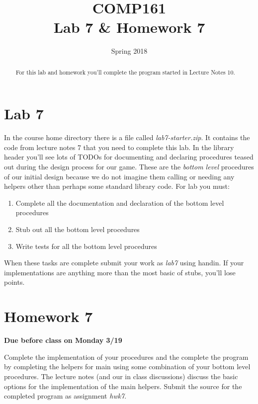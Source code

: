 \documentclass[nobib]{tufte-handout}
\title{COMP161 \\ Lab 7 \& Homework 7}
\author{}
\date{Spring 2018}
\begin{document}
\maketitle

\begin{abstract}
For this lab and homework you'll complete the program started in Lecture Notes 10.
\end{abstract}

\section{Lab 7}

In the course home directory there is a file called \textit{lab7-starter.zip}. It contains the code from lecture notes 7 that you need to complete this lab. In the library header you'll see lots of TODOs for documenting and declaring procedures teased out during the design process for our game. These are the \textit{bottom level} procedures of our initial design because we do not imagine them calling or needing any helpers other than perhaps some standard library code. For lab you must:
\begin{enumerate}
\item Complete all the documentation and declaration of the bottom level procedures
\item Stub out all the bottom level procedures
\item Write tests for all the bottom level procedures
\end{enumerate}
When these tasks are complete submit your work as \textit{lab7} using handin. If your implementations are anything more than the most basic of stubs, you'll lose points.

\section{Homework 7}

\begin{center}
\textbf{Due before class on Monday 3/19}
\end{center}

Complete the implementation of your procedures and the complete the program by completing the helpers for main using some combination of your bottom level procedures. The lecture notes (and our in class discussions) discuss the basic options for the implementation of the main helpers. Submit the source for the completed program as assignment \textit{hwk7}.
\end{document}
